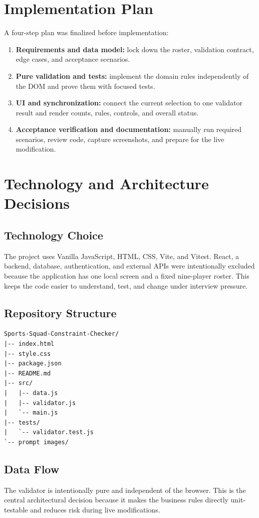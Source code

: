 \documentclass[11pt,a4paper]{article}
\begin{document}
\section{Implementation Plan}
A four-step plan was finalized before implementation:
\begin{enumerate}
\item \textbf{Requirements and data model:} lock down the roster, validation contract, edge cases, and acceptance scenarios.
\item \textbf{Pure validation and tests:} implement the domain rules independently of the DOM and prove them with focused tests.
\item \textbf{UI and synchronization:} connect the current selection to one validator result and render counts, rules, controls, and overall status.
\item \textbf{Acceptance verification and documentation:} manually run required scenarios, review code, capture screenshots, and prepare for the live modification.
\end{enumerate}

\section{Technology and Architecture Decisions}
\subsection{Technology Choice}
The project uses Vanilla JavaScript, HTML, CSS, Vite, and Vitest. React, a backend, database, authentication, and external APIs were intentionally excluded because the application has one local screen and a fixed nine-player roster. This keeps the code easier to understand, test, and change under interview pressure.

\subsection{Repository Structure}
\begin{lstlisting}
Sports-Squad-Constraint-Checker/
|-- index.html
|-- style.css
|-- package.json
|-- README.md
|-- src/
|   |-- data.js
|   |-- validator.js
|   `-- main.js
|-- tests/
|   `-- validator.test.js
`-- prompt images/
\end{lstlisting}

\subsection{Data Flow}
\begin{center}
\end{center}
The validator is intentionally pure and independent of the browser. This is the central architectural decision because it makes the business rules directly unit-testable and reduces risk during live modifications.
\end{document}
